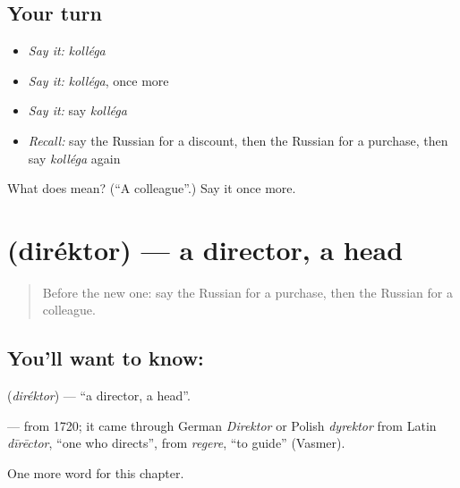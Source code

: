 \subsection*{Your turn}
\begin{itemize}
\raggedright
  \item \emph{Say it:} \emph{kolléga}
  \item \emph{Say it:} \emph{kolléga}, once more
  \item \emph{Say it:} say \emph{kolléga}
  \item \emph{Recall:} say the Russian for a discount, then the Russian for a purchase, then say \emph{kolléga} again
\end{itemize}

\begin{tcolorbox}[breakable,colback=teal!4,colframe=teal!35!black,title={Before you move on}]
What does  mean? (\textquotedblleft{}A colleague\textquotedblright{}.) Say it once more.
\end{tcolorbox}
\section[\texorpdfstring{\ru{директор} (diréktor)}{директор (diréktor)}]{ (diréktor) — a director, a head}

\label{lesson:RU-C201-direktor}



\begin{quote}
Before the new one: say the Russian for a purchase, then the Russian for a colleague.
\end{quote}

\subsection*{You'll want to know: }
\textbf{} (\emph{diréktor}) — \textquotedblleft{}a director, a head\textquotedblright{}.

\begin{cousinweb}
\textbf{} — from 1720; it came through German \emph{Direktor} or Polish \emph{dyrektor} from Latin \emph{dīrēctor}, \textquotedblleft{}one who directs\textquotedblright{}, from \emph{regere}, \textquotedblleft{}to guide\textquotedblright{} (Vasmer).
\end{cousinweb}

\begin{grammarlens}[title={What you've built}]
One more word for this chapter.
\end{grammarlens}

